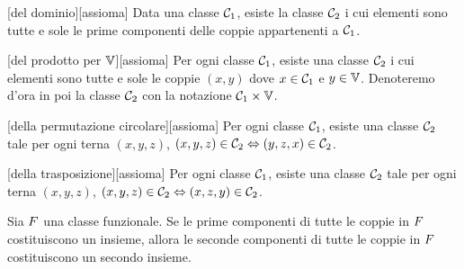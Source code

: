 \begin{Axiom}
	[del dominio][assioma] Data una classe $\mathcal{C}_1$, esiste la classe $\mathcal{C}_2$ i cui elementi sono tutte e sole le prime componenti delle coppie appartenenti a $\mathcal{C}_1$.
\end{Axiom}
\begin{Axiom}
	[del prodotto per $\mathbb{V}$][assioma] Per ogni classe $\mathcal{C}_1$, esiste una classe $\mathcal{C}_2$ i cui elementi sono tutte e sole le coppie $(x,y)$ dove $x \in \mathcal{C}_1$ e $y \in \mathbb{V}$. Denoteremo d'ora in poi la classe $\mathcal{C}_2$ con la notazione $\mathcal{C}_1 \times \mathbb{V}$.
\end{Axiom}
\begin{Axiom}
	[della permutazione circolare][assioma] Per ogni classe $\mathcal{C}_1$, esiste una classe $\mathcal{C}_2$ tale per ogni terna $(x,y,z)$, $(x,y,z) \in \mathcal{C}_2 \Leftrightarrow (y,z,x) \in \mathcal{C}_2$.
\end{Axiom}
\begin{Axiom}
	[della trasposizione][assioma] Per ogni classe $\mathcal{C}_1$, esiste una classe $\mathcal{C}_2$ tale per ogni terna $(x,y,z)$, $(x,y,z) \in \mathcal{C}_2 \Leftrightarrow (x,z,y) \in \mathcal{C}_2$.
\end{Axiom}
\begin{Axiom}
	 Sia $F$ una classe funzionale. Se le prime componenti di tutte le coppie in $F$ costituiscono un insieme, allora le seconde componenti di tutte le coppie in $F$ costituiscono un secondo insieme.
\end{Axiom}
